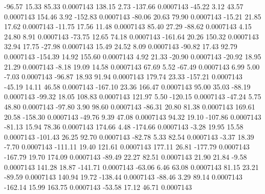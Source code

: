       -96.57       15.33       85.33     0.0007143
      138.15        2.73     -137.66     0.0007143
      -45.22        3.12       43.57     0.0007143
      154.46        3.92     -152.83     0.0007143
      -80.06       20.63       79.90     0.0007143
      -15.21       21.85       17.62     0.0007143
      -11.75       17.56       11.48     0.0007143
       85.40       27.29      -88.62     0.0007143
        4.15       24.80        8.91     0.0007143
      -73.75       12.65       74.18     0.0007143
     -161.64       20.26      150.32     0.0007143
       32.94       17.75      -27.98     0.0007143
       15.49       24.52        8.09     0.0007143
      -90.82       17.43       92.79     0.0007143
     -154.39       14.92      155.60     0.0007143
        4.92       21.33      -20.90     0.0007143
      -20.92       18.95       21.29     0.0007143
       -8.18       19.09       14.58     0.0007143
       67.69        5.52      -67.49     0.0007143
        6.99        5.00       -7.03     0.0007143
      -96.87       18.93       91.94     0.0007143
      179.74       23.33     -157.21     0.0007143
      -45.19       14.11       46.58     0.0007143
     -167.10       23.36      166.47     0.0007143
       95.00       35.03      -88.19     0.0007143
      -99.32       18.05      108.83     0.0007143
      121.97        5.50     -120.15     0.0007143
      -47.24        5.75       48.80     0.0007143
      -97.80        3.90       98.60     0.0007143
      -86.31       20.80       81.38     0.0007143
      169.61       20.58     -158.30     0.0007143
      -49.76        9.39       47.08     0.0007143
       94.32       19.10     -107.86     0.0007143
      -81.13       15.94       78.36     0.0007143
      174.66        4.48     -174.66     0.0007143
       -3.28       19.95       15.58     0.0007143
     -101.43       26.25       92.70     0.0007143
      -82.78        5.33       82.54     0.0007143
       -3.37       18.39       -7.70     0.0007143
     -111.11       19.40      121.61     0.0007143
      177.11       26.81     -177.79     0.0007143
     -167.79       19.70      174.09     0.0007143
      -89.49       22.27       82.51     0.0007143
       21.90       21.84       -9.58     0.0007143
      141.28       18.87     -141.71     0.0007143
      -63.06        6.46       63.08     0.0007143
       81.15       23.21      -89.59     0.0007143
      140.94       19.72     -138.44     0.0007143
      -88.46        3.29       89.14     0.0007143
     -162.14       15.99      163.75     0.0007143
      -53.58       17.12       46.71     0.0007143

